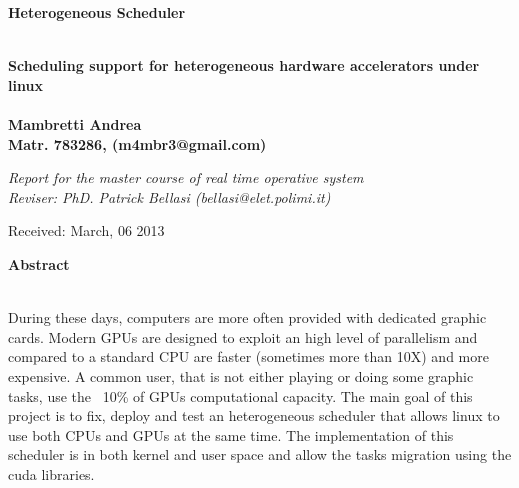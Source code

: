 \documentclass[a4paper,13pt]{article}
\newenvironment*{mytitle}{\begin{LARGE}\bf}{\end{LARGE}\\}%
\newenvironment*{mysubtitle}{\bf}{\\[1.5ex]}%
\newenvironment*{myabstract}{\begin{Large}\bf}{\end{Large}\\[2.5ex]}%
\begin{document}
\begin{mytitle}Heterogeneous Scheduler\end{mytitle}
\begin{mysubtitle}Scheduling support for heterogeneous hardware accelerators under linux\cite{tobias_thesis}\end{mysubtitle}
%
%
\\
Mambretti Andrea\\
Matr. 783286, (m4mbr3@gmail.com)\\
\begin{flushright}
\emph{Report for the master course of real time operative system}\\
\emph{Reviser: PhD. Patrick Bellasi (bellasi@elet.polimi.it)}
\end{flushright}

Received: March, 06 2013\\
\hspace{10ex}

\begin{myabstract} Abstract \end{myabstract}
During these days, computers are more often provided with dedicated graphic cards. Modern GPUs are
designed to exploit an high level of parallelism and compared to a standard CPU are faster
 (sometimes more than 10X) and more expensive. 
A common user, that is not either playing or doing some graphic tasks, use the ~10\% of GPUs 
computational capacity. The main goal of this project is to fix, deploy and test an heterogeneous 
scheduler that allows linux to use both CPUs and GPUs at the same time. The implementation of this 
scheduler is in both kernel and user space and allow the tasks migration using the cuda libraries.
\end{document}
